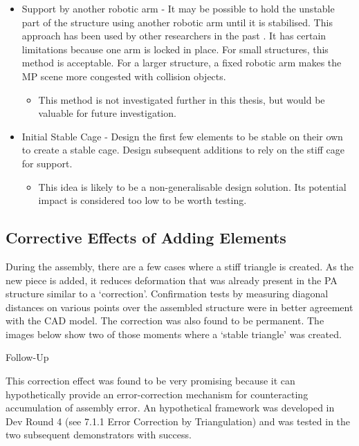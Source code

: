 \begin{itemize}
\begin{itemize}
    \end{itemize}
    \item Support by another robotic arm - It may be possible to hold the unstable part of the structure using another robotic arm until it is stabilised. This approach has been used by other researchers in the past \parencite{adelDesignRoboticallyFabricated2018,helmreichRoboticAssemblyModular2022,paraschoComputationalDesignRobotically2018}. It has certain limitations because one arm is locked in place. For small structures, this method is acceptable. For a larger structure, a fixed robotic arm makes the MP scene more congested with collision objects.
    \begin{itemize}
        \item This method is not investigated further in this thesis, but would be valuable for future investigation.
    \end{itemize}
    \item Initial Stable Cage - Design the first few elements to be stable on their own to create a stable cage. Design subsequent additions to rely on the stiff cage for support.
    \begin{itemize}
        \item This idea is likely to be a non-generalisable design solution. Its potential impact is considered too low to be worth testing.
    \end{itemize}
\end{itemize}

\subsection{Corrective Effects of Adding Elements}
During the assembly, there are a few cases where a stiff triangle is created. As the new piece is added, it reduces deformation that was already present in the PA structure similar to a ‘correction’. Confirmation tests by measuring diagonal distances on various points over the assembled structure were in better agreement with the CAD model. The correction was also found to be permanent. The images below show two of those moments where a ‘stable triangle’ was created.

Follow-Up

This correction effect was found to be very promising because it can hypothetically provide an error-correction mechanism for counteracting accumulation of assembly error. An hypothetical framework was developed in Dev Round 4  (see 7.1.1 Error Correction by Triangulation) and was tested in the two subsequent demonstrators with success.

